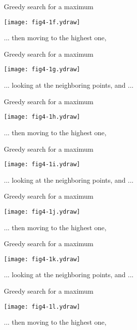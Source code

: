 \documentclass[bluish,slideColor,colorBG,pdf]{prosper}
\begin{document}
\begin{slide}[Replace]{Greedy search for a maximum}

\centerline{\texttt{[image: fig4-1f.ydraw]}}
\bigskip

... then moving to the highest one,

\end{slide}

\begin{slide}[Replace]{Greedy search for a maximum}

\centerline{\texttt{[image: fig4-1g.ydraw]}}
\bigskip

... looking at the neighboring points, and ...

\end{slide}

\begin{slide}[Replace]{Greedy search for a maximum}

\centerline{\texttt{[image: fig4-1h.ydraw]}}
\bigskip

... then moving to the highest one,

\end{slide}

\begin{slide}[Replace]{Greedy search for a maximum}

\centerline{\texttt{[image: fig4-1i.ydraw]}}
\bigskip

... looking at the neighboring points, and ...

\end{slide}

\begin{slide}[Replace]{Greedy search for a maximum}

\centerline{\texttt{[image: fig4-1j.ydraw]}}
\bigskip

... then moving to the highest one,

\end{slide}

\begin{slide}[Replace]{Greedy search for a maximum}

\centerline{\texttt{[image: fig4-1k.ydraw]}}
\bigskip

... looking at the neighboring points, and ...

\end{slide}

\begin{slide}[Replace]{Greedy search for a maximum}

\centerline{\texttt{[image: fig4-1l.ydraw]}}
\bigskip

... then moving to the highest one,

\end{slide}
\end{document}
